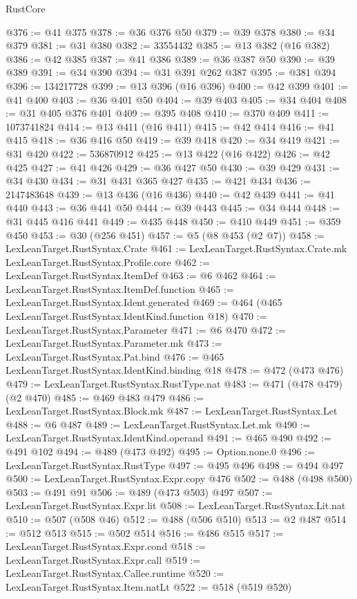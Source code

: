 \begin{lexlean}{RustCore}
\begin{coremodule}
@376 := @41 @375
@378 := @36 @376 @50
@379 := @39 @378
@380 := @34 @379
@381 := @31 @380
@382 := 33554432
@385 := @13 @382 (@16 @382)
@386 := @42 @385
@387 := @41 @386
@389 := @36 @387 @50
@390 := @39 @389
@391 := @34 @390
@394 := @31 @391 @262 @387
@395 := @381 @394
@396 := 134217728
@399 := @13 @396 (@16 @396)
@400 := @42 @399
@401 := @41 @400
@403 := @36 @401 @50
@404 := @39 @403
@405 := @34 @404
@408 := @31 @405 @376 @401
@409 := @395 @408
@410 := @370 @409
@411 := 1073741824
@414 := @13 @411 (@16 @411)
@415 := @42 @414
@416 := @41 @415
@418 := @36 @416 @50
@419 := @39 @418
@420 := @34 @419
@421 := @31 @420
@422 := 536870912
@425 := @13 @422 (@16 @422)
@426 := @42 @425
@427 := @41 @426
@429 := @36 @427 @50
@430 := @39 @429
@431 := @34 @430
@434 := @31 @431 @365 @427
@435 := @421 @434
@436 := 2147483648
@439 := @13 @436 (@16 @436)
@440 := @42 @439
@441 := @41 @440
@443 := @36 @441 @50
@444 := @39 @443
@445 := @34 @444
@448 := @31 @445 @416 @441
@449 := @435 @448
@450 := @410 @449
@451 := @359 @450
@453 := @30 (@256 @451)
@457 := @5 (@8 @453 (@2 @7))
@458 := LexLeanTarget.RustSyntax.Crate
@461 := LexLeanTarget.RustSyntax.Crate.mk LexLeanTarget.RustSyntax.Profile.core
@462 := LexLeanTarget.RustSyntax.ItemDef
@463 := @6 @462
@464 := LexLeanTarget.RustSyntax.ItemDef.function
@465 := LexLeanTarget.RustSyntax.Ident.generated
@469 := @464 (@465 LexLeanTarget.RustSyntax.IdentKind.function @18)
@470 := LexLeanTarget.RustSyntax.Parameter
@471 := @6 @470
@472 := LexLeanTarget.RustSyntax.Parameter.mk
@473 := LexLeanTarget.RustSyntax.Pat.bind
@476 := @465 LexLeanTarget.RustSyntax.IdentKind.binding @18
@478 := @472 (@473 @476)
@479 := LexLeanTarget.RustSyntax.RustType.nat
@483 := @471 (@478 @479) (@2 @470)
@485 := @469 @483 @479
@486 := LexLeanTarget.RustSyntax.Block.mk
@487 := LexLeanTarget.RustSyntax.Let
@488 := @6 @487
@489 := LexLeanTarget.RustSyntax.Let.mk
@490 := LexLeanTarget.RustSyntax.IdentKind.operand
@491 := @465 @490
@492 := @491 @102
@494 := @489 (@473 @492)
@495 := Option.none.{0}
@496 := LexLeanTarget.RustSyntax.RustType
@497 := @495 @496
@498 := @494 @497
@500 := LexLeanTarget.RustSyntax.Expr.copy @476
@502 := @488 (@498 @500)
@503 := @491 @91
@506 := @489 (@473 @503) @497
@507 := LexLeanTarget.RustSyntax.Expr.lit
@508 := LexLeanTarget.RustSyntax.Lit.nat
@510 := @507 (@508 @46)
@512 := @488 (@506 @510)
@513 := @2 @487
@514 := @512 @513
@515 := @502 @514
@516 := @486 @515
@517 := LexLeanTarget.RustSyntax.Expr.cond
@518 := LexLeanTarget.RustSyntax.Expr.call
@519 := LexLeanTarget.RustSyntax.Callee.runtime
@520 := LexLeanTarget.RustSyntax.Item.natLt
@522 := @518 (@519 @520)

\end{coremodule}
\end{lexlean}
